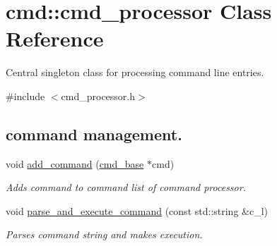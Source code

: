 \hypertarget{classcmd_1_1cmd__processor}{\section{cmd\-:\-:cmd\-\_\-processor Class Reference}
\label{classcmd_1_1cmd__processor}
}


Central singleton class for processing command line entries.  




{\ttfamily \#include $<$cmd\-\_\-processor.\-h$>$}

\subsection*{command management.}
\begin{DoxyCompactItemize}
\item 
void \hyperlink{classcmd_1_1cmd__processor_a03712564937c37f196633880f8876a3a}{add\-\_\-command} (\hyperlink{classcmd_1_1cmd__base}{cmd\-\_\-base} $\ast$cmd)
\begin{DoxyCompactList}\small\item\em Adds command to command list of command processor. \end{DoxyCompactList}\item 
void \hyperlink{classcmd_1_1cmd__processor_a03ac466a41a77fc30490ae72446c6e2d}{parse\-\_\-and\-\_\-execute\-\_\-command} (const std\-::string \&c\-\_\-l)
\begin{DoxyCompactList}\small\item\em Parses command string and makes execution. \end{DoxyCompactList}\end{DoxyCompactItemize}
